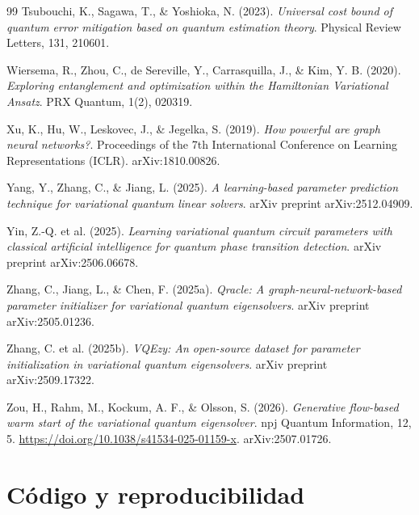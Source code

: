 \documentclass[11pt,a4paper,spanish]{book}
\begin{document}
\begin{thebibliography}{99}
 Tsubouchi, K., Sagawa, T., \& Yoshioka, N. (2023). \emph{Universal cost bound of quantum error mitigation based on quantum estimation theory}. Physical Review Letters, 131, 210601.

 Wiersema, R., Zhou, C., de Sereville, Y., Carrasquilla, J., \& Kim, Y. B. (2020). \emph{Exploring entanglement and optimization within the Hamiltonian Variational Ansatz}. PRX Quantum, 1(2), 020319.

 Xu, K., Hu, W., Leskovec, J., \& Jegelka, S. (2019). \emph{How powerful are graph neural networks?}. Proceedings of the 7th International Conference on Learning Representations (ICLR). arXiv:1810.00826.

 Yang, Y., Zhang, C., \& Jiang, L. (2025). \emph{A learning-based parameter prediction technique for variational quantum linear solvers}. arXiv preprint arXiv:2512.04909.

 Yin, Z.-Q. et al. (2025). \emph{Learning variational quantum circuit parameters with classical artificial intelligence for quantum phase transition detection}. arXiv preprint arXiv:2506.06678.

 Zhang, C., Jiang, L., \& Chen, F. (2025a). \emph{Qracle: A graph-neural-network-based parameter initializer for variational quantum eigensolvers}. arXiv preprint arXiv:2505.01236.

 Zhang, C. et al. (2025b). \emph{VQEzy: An open-source dataset for parameter initialization in variational quantum eigensolvers}. arXiv preprint arXiv:2509.17322.

 Zou, H., Rahm, M., Kockum, A. F., \& Olsson, S. (2026). \emph{Generative flow-based warm start of the variational quantum eigensolver}. npj Quantum Information, 12, 5. \url{https://doi.org/10.1038/s41534-025-01159-x}. arXiv:2507.01726.

\end{thebibliography}



\appendix

\chapter{Código y reproducibilidad}
\label{sec:codigo}
\end{document}
